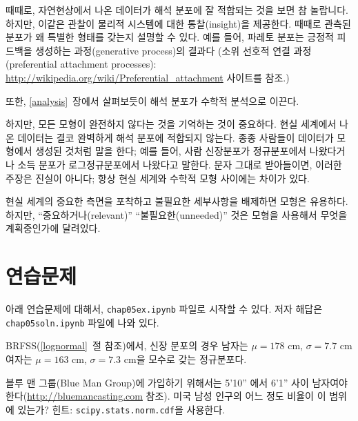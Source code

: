 때때로, 자연현상에서 나온 데이터가 해석 분포에 잘 적합되는 것을 보면 참 놀랍니다. 하지만, 이같은 관찰이 물리적 시스템에 대한 통찰(insight)을 제공한다.
때때로 관측된 분포가 왜 특별한 형태를 갖는지 설명할 수 있다.
예를 들어, 파레토 분포는 긍정적 피드백을 생성하는 과정(generative process)의 결과다 (소위 선호적 연결 과정 (preferential attachment processes): \url{http://wikipedia.org/wiki/Preferential_attachment} 사이트를 참조.)

또한, \ref{analysis}~장에서 살펴보듯이 해석 분포가 수학적 분석으로 이끈다. 

하지만, 모든 모형이 완전하지 않다는 것을 기억하는 것이 중요하다.
현실 세계에서 나온 데이터는 결코 완벽하게 해석 분포에 적합되지 않는다. 종종 사람들이 데이터가 모형에서 생성된 것처럼 말을 한다; 예를 들어, 사람 신장분포가 정규분포에서 나왔다거나 소득 분포가 로그정규분포에서 나왔다고 말한다. 문자 그대로 받아들이면, 이러한 주장은 진실이 아니다; 항상 현실 세계와 수학적 모형 사이에는 차이가 있다.

현실 세계의 중요한 측면을 포착하고 불필요한 세부사항을 배제하면 모형은 유용하다. 하지만, ``중요하거나(relevant)'' ``불필요한(unneeded)'' 것은 모형을 사용해서 무엇을 계획중인가에 달려있다.

\section{연습문제}

아래 연습문제에 대해서, \verb"chap05ex.ipynb" 파일로 시작할 수 있다.
저자 해답은 \verb"chap05soln.ipynb" 파일에 나와 있다.


\begin{exercise}

BRFSS(\ref{lognormal}~절 참조)에서, 
신장 분포의 경우 남자는 $\mu = 178$ cm, $\sigma = 7.7$ cm
여자는 $\mu = 163$ cm, $\sigma = 7.3$ cm을 모수로 갖는 정규분포다.


블루 맨 그룹(Blue Man Group)에 가입하기 위해서는 
5'10'' 에서 6'1'' 사이 남자여야 한다(\url{http://bluemancasting.com} 참조). 
미국 남성 인구의 어느 정도 비율이 이 범위에 있는가?
힌트: {\tt scipy.stats.norm.cdf}을 사용한다.

\end{exercise}



